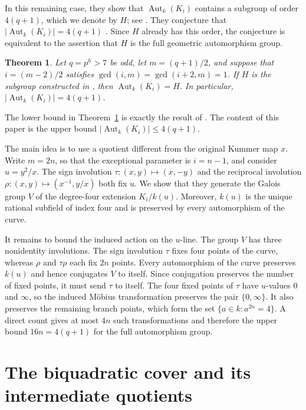 \documentclass[11pt,reqno]{amsart}
\newtheorem{theorem}{Theorem}[section]
\theoremstyle{remark}
\newcommand{\Aut}{\operatorname{Aut}}
\begin{document}
In this remaining case, they show that $\Aut_k(K_i)$ contains a subgroup of order $4(q+1)$, which we denote by $H$; see \cite[Theorem~4.6]{BeelenMontanucciNiemannQuoos}. They conjecture that $|\Aut_k(K_i)|=4(q+1)$ \cite[Conjecture~4.11]{BeelenMontanucciNiemannQuoos}. Since $H$ already has this order, the conjecture is equivalent to the assertion that $H$ is the full geometric automorphism group.
\begin{theorem}\label{thm:main}
Let $q=p^h>7$ be odd, let $m=(q+1)/2$, and suppose that $i=(m-2)/2$ satisfies $\gcd(i,m)=\gcd(i+2,m)=1$. If $H$ is the subgroup constructed in \cite[Theorem~4.6]{BeelenMontanucciNiemannQuoos}, then $\Aut_k(K_i)=H$. In particular, $|\Aut_k(K_i)|=4(q+1)$.
\end{theorem}

The lower bound in Theorem~\ref{thm:main} is exactly the result of \cite[Theorem~4.6]{BeelenMontanucciNiemannQuoos}. The content of this paper is the upper bound $|\Aut_k(K_i)|\leq4(q+1)$.

The main idea is to use a quotient different from the original Kummer map $x$. Write $m=2n$, so that the exceptional parameter is $i=n-1$, and consider $u=y^2/x$. The sign involution $\tau:(x,y)\mapsto(x,-y)$ and the reciprocal involution $\rho:(x,y)\mapsto(x^{-1},y/x)$ both fix $u$. We show that they generate the Galois group $V$ of the degree-four extension $K_i/k(u)$. Moreover, $k(u)$ is the unique rational subfield of index four and is preserved by every automorphism of the curve.

It remains to bound the induced action on the $u$-line. The group $V$ has three nonidentity involutions. The sign involution $\tau$ fixes four points of the curve, whereas $\rho$ and $\tau\rho$ each fix $2n$ points. Every automorphism of the curve preserves $k(u)$ and hence conjugates $V$ to itself. Since conjugation preserves the number of fixed points, it must send $\tau$ to itself. The four fixed points of $\tau$ have $u$-values $0$ and $\infty$, so the induced M\"{o}bius transformation preserves the pair $\{0,\infty\}$. It also preserves the remaining branch points, which form the set $\{a\in k:a^{2n}=4\}$. A direct count gives at most $4n$ such transformations and therefore the upper bound $16n=4(q+1)$ for the full automorphism group.


\section{The biquadratic cover and its intermediate quotients}
\end{document}
